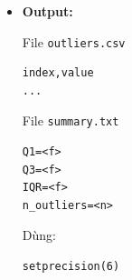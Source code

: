 \begin{itemize}
\begin{itemize}
\begin{itemize}
            \item Không có outlier
            \[
                \Rightarrow
                outliers.csv \text{ chỉ có header}
            \]
        \end{itemize}

        \item \textbf{Module 1 (Đọc file):}

        \begin{itemize}
            \item Hàm \texttt{readValues()}
        \end{itemize}

        \item \textbf{Module 2 (Tính percentile):}

        \begin{itemize}
            \item Hàm \texttt{computeQuartile()}
            \item Tính:
            \[
                Q1,\ Q3
            \]
        \end{itemize}

        \item \textbf{Module 3 (Phát hiện outlier):}

        \begin{itemize}
            \item Hàm \texttt{detectOutliers()}
        \end{itemize}

        \item \textbf{Module 4 (Ghi outlier):}

        \begin{itemize}
            \item Hàm \texttt{writeOutliers()}
        \end{itemize}

        \item \textbf{Module 5 (Ghi summary):}

        \begin{itemize}
            \item Hàm \texttt{writeSummary()}
        \end{itemize}

    \end{itemize}

    \item \textbf{Output:}

    File \texttt{outliers.csv}

\begin{lstlisting}
index,value
...
\end{lstlisting}

    File \texttt{summary.txt}

\begin{lstlisting}
Q1=<f>
Q3=<f>
IQR=<f>
n_outliers=<n>
\end{lstlisting}

    Dùng:
\begin{lstlisting}
setprecision(6)
\end{lstlisting}

\end{itemize}

